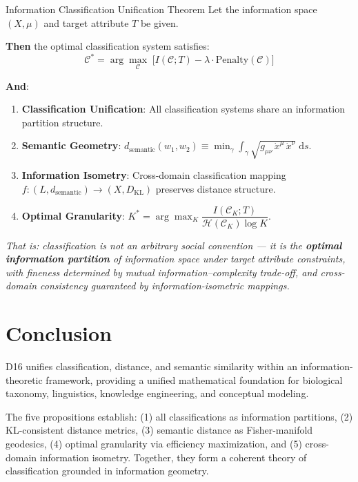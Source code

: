 \documentclass[12pt, a4paper]{article}
\newcommand{\diff}{\mathrm{d}}
\newcommand{\KL}{D_{\mathrm{KL}}}
\newcommand{\ssemd}{d_{\mathrm{semantic}}}
\newcommand{\ssem}{\sqrt{g_{\mu\nu}\,\dot{x}^\mu\,\dot{x}^\nu}}
\begin{document}
\begin{thmbox}{Information Classification Unification Theorem}
Let the information space $(X, \mu)$ and target attribute $T$ be given.

\textbf{Then} the optimal classification system satisfies:
\[
\boxed{\mathcal{C}^* = \arg\max_{\mathcal{C}}\;\Big[I(\mathcal{C}; T) - \lambda \cdot \mathrm{Penalty}(\mathcal{C})\Big]}
\]

\textbf{And}:
\begin{enumerate}
    \item \textbf{Classification Unification}: All classification systems share an information partition structure.
    \item \textbf{Semantic Geometry}: $\ssemd(w_1, w_2) \equiv \min_{\gamma} \displaystyle\int_{\gamma} \ssem\;\diff s$.
    \item \textbf{Information Isometry}: Cross-domain classification mapping $f: (L, \ssemd) \to (X, \KL)$ preserves distance structure.
    \item \textbf{Optimal Granularity}: $K^* = \arg\max_K \dfrac{I(\mathcal{C}_K; T)}{\mathcal{H}(\mathcal{C}_K) \log K}$.
\end{enumerate}

\textit{That is: classification is not an arbitrary social convention --- it is the \textbf{optimal information partition} of information space under target attribute constraints, with fineness determined by mutual information--complexity trade-off, and cross-domain consistency guaranteed by information-isometric mappings.}
\end{thmbox}

\section{Conclusion}

D16 unifies classification, distance, and semantic similarity within an information-theoretic framework, providing a unified mathematical foundation for biological taxonomy, linguistics, knowledge engineering, and conceptual modeling.

The five propositions establish: (1) all classifications as information partitions, (2) KL-consistent distance metrics, (3) semantic distance as Fisher-manifold geodesics, (4) optimal granularity via efficiency maximization, and (5) cross-domain information isometry. Together, they form a coherent theory of classification grounded in information geometry.
\end{document}
